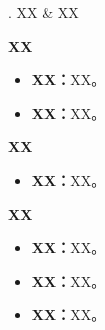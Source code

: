 \begin{frame}{\MakeUppercase{}. XX \& XX}
    \begin{block}{\textbf{XX}}
        \vspace{-0.5em}

        \begin{itemize}
            \item \textbf{XX：}XX。
            \item \textbf{XX：}XX。
        \end{itemize}
    \end{block}

    \vspace{-0.5em}

    \begin{block}{\textbf{XX}}
        \vspace{-0.5em}
        \begin{itemize}
            \item \textbf{XX：}XX。
        \end{itemize}
    \end{block}

    \vspace{-0.5em}

    \begin{block}{\textbf{XX}}
        \vspace{-0.5em}
        \begin{itemize}
            \item \textbf{XX：}XX。
            \item \textbf{XX：}XX。
            \item \textbf{XX：}XX。
        \end{itemize}
    \end{block}
\end{frame}
